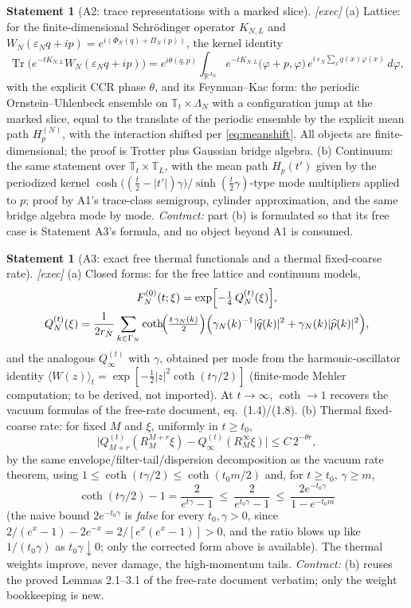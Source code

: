 \documentclass[11pt,a4paper]{article}
\theoremstyle{plain}
\theoremstyle{definition}
\newtheorem{statement}[theorem]{Statement}
\newcommand{\R}{\mathbb{R}}
\newcommand{\T}{\mathbb{T}}
\newcommand{\eps}{\varepsilon}
\DeclareMathOperator{\Trace}{Tr}
\begin{document}
\begin{statement}[A2: trace representations with a marked slice]\label{st:A2}
\emph{[exec]} (a) Lattice: for the finite-dimensional Schr\"odinger operator
$K_{N,L}$ and $W_N(\eps_Nq+ip)=e^{i(\Phi_N(q)+\Pi_N(p))}$, the kernel identity
\[
 \Trace\bigl(e^{-tK_{N,L}}W_N(\eps_Nq+ip)\bigr)
 =e^{i\theta(q,p)}\!\!\int_{\R^{\Lambda_N}}\!\!
 e^{-tK_{N,L}}\bigl(\varphi+p,\varphi\bigr)\,
 e^{i\,\eps_N\sum_xq(x)\varphi(x)}\,d\varphi ,
\]
with the explicit CCR phase $\theta$, and its Feynman--Kac form: the periodic
Ornstein--Uhlenbeck ensemble on $\T_t\times\Lambda_N$ with a configuration jump at the
marked slice, equal to the translate of the periodic ensemble by the explicit mean
path $H^{(N)}_p$, with the interaction shifted per \eqref{eq:meanshift}. All objects
are finite-dimensional; the proof is Trotter plus Gaussian bridge algebra.
(b) Continuum: the same statement over $\T_t\times\T_L$, with the mean path
$H_p(t')$ given by the periodized kernel
$\cosh\bigl((\tfrac t2-|t'|)\gamma\bigr)/\!\sinh(\tfrac t2\gamma)$-type mode
multipliers applied to $p$; proof by A1's trace-class semigroup, cylinder
approximation, and the same bridge algebra mode by mode. \emph{Contract:} part (b) is
formulated so that its free case is Statement A3's formula, and no object beyond A1 is
consumed.
\end{statement}

\begin{statement}[A3: exact free thermal functionals and a thermal fixed-coarse
rate]\label{st:A3}
\emph{[exec]} (a) Closed forms: for the free lattice and continuum models,
\[
\begin{gathered}
 F^{(0)}_N(t;\xi)=\exp\Bigl[-\tfrac14\,Q^{(t)}_{N}(\xi)\Bigr],\\
 Q^{(t)}_{N}(\xi)=\frac1{2r_N}\sum_{k\in\Gamma_N}
 \coth\!\Bigl(\tfrac{t\,\gamma_N(k)}2\Bigr)
 \Bigl(\gamma_N(k)^{-1}|\widehat q(k)|^2+\gamma_N(k)|\widehat p(k)|^2\Bigr),
\end{gathered}
\]
and the analogous $Q^{(t)}_{\infty}$ with $\gamma$, obtained per mode from the
harmonic-oscillator identity
$\langle W(z)\rangle_{t}=\exp[-\tfrac12|z|^2\coth(t\gamma/2)]$ (finite-mode Mehler
computation; to be derived, not imported). At $t\to\infty$, $\coth\to1$ recovers the
vacuum formulas of the free-rate document, eq.~(1.4)/(1.8).
(b) Thermal fixed-coarse rate: for fixed $M$ and $\xi$, uniformly in $t\ge t_0$,
\[
 \bigl|Q^{(t)}_{M+r}(R_M^{M+r}\xi)-Q^{(t)}_{\infty}(R_M^\infty\xi)\bigr|
 \le C\,2^{-\theta r},
\]
by the same envelope/filter-tail/dispersion decomposition as the vacuum rate theorem,
using $1\le\coth(t\gamma/2)\le\coth(t_0m/2)$ and, for $t\ge t_0$, $\gamma\ge m$,
\[
 \coth(t\gamma/2)-1=\frac2{e^{t\gamma}-1}\ \le\ \frac2{e^{t_0\gamma}-1}
 \ \le\ \frac{2e^{-t_0\gamma}}{1-e^{-t_0m}}
\]
(the naive bound $2e^{-t_0\gamma}$ is \emph{false} for every $t_0,\gamma>0$, since
$2/(e^x-1)-2e^{-x}=2/[e^x(e^x-1)]>0$, and the ratio blows up like $1/(t_0\gamma)$ as
$t_0\gamma\downarrow0$; only the corrected form above is available). The thermal
weights improve, never damage, the high-momentum tails. \emph{Contract:} (b) reuses the proved Lemmas 2.1--3.1 of the
free-rate document verbatim; only the weight bookkeeping is new.
\end{statement}
\end{document}
